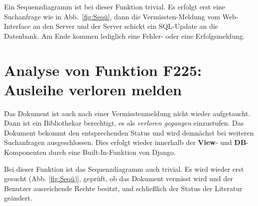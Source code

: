 Ein Sequenzdiagramm ist bei dieser Funktion trivial. Es erfolgt erst eine Suchanfrage wie in Abb.\ \ref{fig:Seqü}, dann die Vermissten-Meldung vom Web-Interface an den Server und der Server schickt ein SQL-Update an die Datenbank. Am Ende kommen lediglich eine Fehler- oder eine Erfolgsmeldung.

\section{Analyse von Funktion F225: Ausleihe verloren melden}
\label{f:225}
Das Dokument ist auch nach einer Vermisstenmeldung nicht wieder aufgetaucht. Dann ist ein Bibliothekar berechtigt, es als \emph{verloren gegangen} einzustufen. Das Dokument bekommt den entsprechenden Status und wird demnächst bei weiteren Suchanfragen ausgeschlossen. Dies erfolgt wieder innerhalb der \textbf{View}- und \textbf{DB}-Komponenten durch eine Built-In-Funktion von Django.

Bei dieser Funktion ist das Sequenzdiagramm auch trivial. Es wird wieder erst gesucht (Abb. \ref{fig:Seqü)}, geprüft, ob das Dokument vermisst wird und der Benutzer ausreichende Rechte besitzt, und schließlich der Status der Literatur geändert. 
